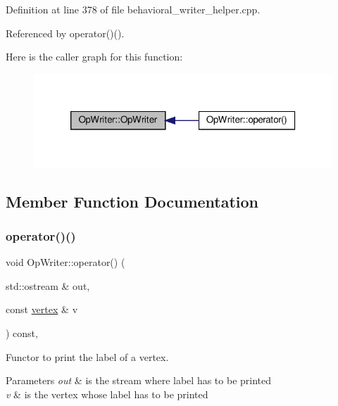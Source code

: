 Definition at line 378 of file behavioral\+\_\+writer\+\_\+helper.\+cpp.



Referenced by operator()().

Here is the caller graph for this function\+:
\nopagebreak
\begin{figure}[H]
\begin{center}
\leavevmode
\includegraphics[width=320pt]{db/d95/classOpWriter_a236c995006cfce8a9b9984ced76ea9cc_icgraph}
\end{center}
\end{figure}


\subsection{Member Function Documentation}
\mbox{\label{classOpWriter_a58cae1db8599d723605d387a61c0c967}} 
\subsubsection{\texorpdfstring{operator()()}{operator()()}}
{\footnotesize\ttfamily void Op\+Writer\+::operator() (\begin{DoxyParamCaption}\item[{std\+::ostream \&}]{out,  }\item[{const \hyperlink{graph_8hpp_abefdcf0544e601805af44eca032cca14}{vertex} \&}]{v }\end{DoxyParamCaption}) const\hspace{0.3cm}{\ttfamily [override]}, {\ttfamily [virtual]}}



Functor to print the label of a vertex. 


\begin{DoxyParams}{Parameters}
{\em out} & is the stream where label has to be printed \\
\hline
{\em v} & is the vertex whose label has to be printed \\
\hline
\end{DoxyParams}


